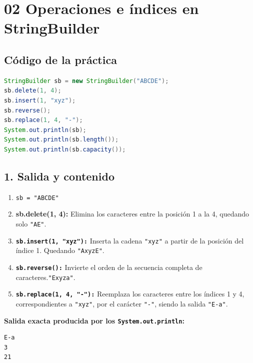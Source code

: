 \documentclass{article}
\begin{document}
\newpage

\section*{02 Operaciones e índices en StringBuilder}

\subsection*{Código de la práctica}
\begin{lstlisting}[language=Java]
StringBuilder sb = new StringBuilder("ABCDE");
sb.delete(1, 4);
sb.insert(1, "xyz");
sb.reverse();
sb.replace(1, 4, "-");
System.out.println(sb);
System.out.println(sb.length());
System.out.println(sb.capacity());
\end{lstlisting}

\subsection*{1. Salida y contenido}
\begin{enumerate}
    \item \texttt{sb = "ABCDE"}
    \item \textbf{sb.delete(1, 4):} Elimina los caracteres entre la posición 1 a la 4, quedando solo \texttt{"AE"}.
    \item \textbf{\texttt{sb.insert(1, "xyz"):}} Inserta la cadena \texttt{"xyz"} a partir de la posición del índice 1. Quedando \texttt{"AxyzE"}.
    \item \textbf{\texttt{sb.reverse():}} Invierte el orden de la secuencia completa de caracteres.\texttt{"Exyza"}.
    \item \textbf{\texttt{sb.replace(1, 4, "-"):}} Reemplaza los caracteres entre los índices 1  y 4, correspondientes a \texttt{"xyz"}, por el carácter \texttt{"-"}, siendo la salida \texttt{"E-a"}.
\end{enumerate}

\textbf{Salida exacta producida por los \texttt{System.out.println}:}
\begin{verbatim}
E-a
3
21
\end{verbatim}
\end{document}

